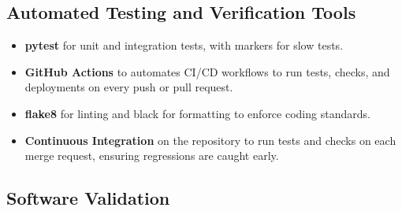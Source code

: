 \documentclass[12pt, titlepage]{article}
\begin{document}
\subsection{Automated Testing and Verification Tools}




\begin{itemize}
  \item \textbf{pytest} for unit and integration tests, with markers for slow tests.
  \item \textbf{GitHub Actions} to automates CI/CD workflows to run tests, checks, and deployments on every push or pull request.
  \item \textbf{flake8} for linting and black for formatting to
  enforce coding standards.
  \item \textbf{Continuous Integration} on the repository to run tests and checks on each merge request, ensuring regressions are caught early.
\end{itemize}





\subsection{Software Validation}


\end{document}
